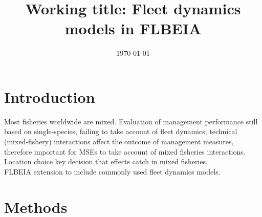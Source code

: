 \documentclass[12pt, halfline, a4paper]{ouparticle}
\begin{document}
\title{Working title: Fleet dynamics models in FLBEIA}

\author{
	\address{GMIT}
	\address{CEFAS}
	\and
	\address{GMIT}
	\and
	\address{AZTI}
}


\date{\today}


\maketitle

\section{Introduction}
\label{intro}

Most fisheries worldwide are mixed. Evaluation of management performance still
based on single-species, failing to take account of fleet dynamics; technical
(mixed-fishery) interactions affect the outcome of management measures,
therefore important for MSEs to take account of mixed fisheries interactions.
\\

Location choice key decision that effects catch in mixed fisheries.\\

FLBEIA extension to include commonly used fleet dynamics models.	\\


\section{Methods}
\label{meth}
\end{document}
